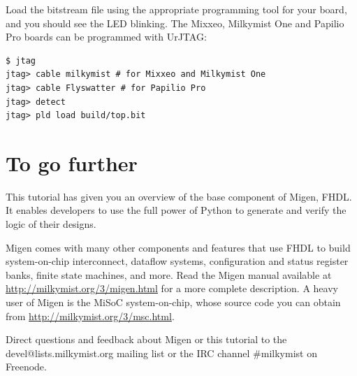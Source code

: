 \documentclass[11pt]{paper}
\begin{document}
Load the bitstream file using the appropriate programming tool for your board, and you should see the LED blinking. The Mixxeo, Milkymist One and Papilio Pro boards can be programmed with UrJTAG:

\begin{verbatim}
$ jtag
jtag> cable milkymist # for Mixxeo and Milkymist One
jtag> cable Flyswatter # for Papilio Pro
jtag> detect
jtag> pld load build/top.bit
\end{verbatim}

\section{To go further}
This tutorial has given you an overview of the base component of Migen, FHDL. It enables developers to use the full power of Python to generate and verify the logic of their designs.

Migen comes with many other components and features that use FHDL to build system-on-chip interconnect, dataflow systems, configuration and status register banks, finite state machines, and more. Read the Migen manual available at \url{http://milkymist.org/3/migen.html} for a more complete description. A heavy user of Migen is the MiSoC system-on-chip, whose source code you can obtain from \url{http://milkymist.org/3/msc.html}.

Direct questions and feedback about Migen or this tutorial to the devel@lists.milkymist.org mailing list or the IRC channel \#milkymist on Freenode.
\end{document}
